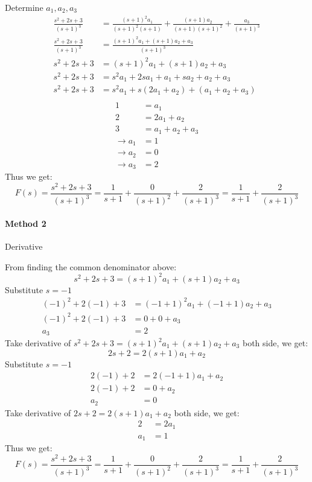 Determine \(a_1,a_2,a_3\)
\[
\begin{split}
	\frac{s^2+2s+3}{(s+1)^3} &= \frac{(s+1)^2a_1}{(s+1)^2(s+1)} + \frac{(s+1)a_2}{(s+1)(s+1)^2} + \frac{a_3}{(s+1)^3} \\
	\frac{s^2+2s+3}{(s+1)^3} &= \frac{(s+1)^2a_1+(s+1)a_2+a_3}{(s+1)^3} \\
	s^2+2s+3 &= (s+1)^2a_1+(s+1)a_2+a_3 \\
	s^2+2s+3 &= s^2 a_1 + 2s a_1 + a_1+ sa_2 + a_2 + a_3 \\
	s^2+2s+3 &= s^2 a_1 + s(2a_1+a_2) + (a_1+a_2+a_3)\\
\end{split}
\]
\[
\begin{split}
	1 &= a_1 \\
	2 &= 2a_1+a_2 \\
	3 &= a_1+a_2+a_3 \\
	\rightarrow a_1 &= 1 \\
	\rightarrow a_2 &= 0 \\
	\rightarrow a_3 &= 2
\end{split}
\]
Thus we get:
\[
\boxed{
	F(s) = \frac{s^2+2s+3}{(s+1)^3} = \frac{1}{s+1} + \frac{0}{(s+1)^2} + \frac{2}{(s+1)^3} = \frac{1}{s+1} + \frac{2}{(s+1)^3}}
\]

\paragraph{Method 2} Derivative

From finding the common denominator above:
\[
s^2+2s+3 = (s+1)^2a_1+(s+1)a_2+a_3 
\]
Substitute \(s = -1\)
\[
\begin{split}
	(-1)^2+2(-1)+3 &= (-1+1)^2a_1+(-1+1)a_2+a_3 \\
	(-1)^2+2(-1)+3 &= 0+0+a_3 \\
	a_3 &= 2
\end{split}
\]
Take derivative of \(s^2+2s+3 = (s+1)^2a_1+(s+1)a_2+a_3\) both side, we get:
\[
2s+2 = 2(s+1)a_1+a_2
\]
Substitute \(s = -1\)
\[
\begin{split}
	2(-1)+2 &= 2(-1+1)a_1+a_2 \\
	2(-1)+2 &= 0+a_2 \\
	a_2 &= 0
\end{split}
\]
Take derivative of \(2s+2 = 2(s+1)a_1+a_2\) both side, we get:
\[
\begin{split}
	2 &= 2a_1 \\
	a_1 &= 1
\end{split}
\]
Thus we get:
\[
\boxed{
	F(s) = \frac{s^2+2s+3}{(s+1)^3} = \frac{1}{s+1} + \frac{0}{(s+1)^2} + \frac{2}{(s+1)^3} = \frac{1}{s+1} + \frac{2}{(s+1)^3}}
\]



